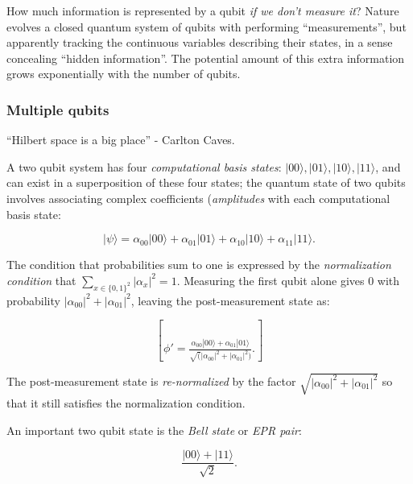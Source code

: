 \documentclass{article}
\numberwithin{equation}{section}
\newcommand{\bracket}[1]{|#1\rangle}
\begin{document}
How much information is represented by a qubit \textit{if we don't measure it}? Nature evolves a closed quantum system of qubits with performing ``measurements'', but apparently tracking the continuous variables describing their states, in a sense concealing ``hidden information''. The potential amount of this extra information grows exponentially with the number of qubits.

\subsubsection{Multiple qubits}

``Hilbert space is a big place'' - Carlton Caves.

A two qubit system has four \textit{computational basis states}: $\bracket{00}, \bracket{01}, \bracket{10}, \bracket{11}$, and can exist in a superposition of these four states; the quantum state of two qubits involves associating complex coefficients (\textit{amplitudes} with each computational basis state:

\begin{equation} \label{eq:1.4}
\bracket{\psi} = \alpha_{00} \bracket{00} + \alpha_{01} \bracket{01} + \alpha_{10} \bracket{10} + \alpha_{11} \bracket{11}.
\end{equation}

The condition that probabilities sum to one is expressed by the \textit{normalization condition} that $\sum_{x \in \{0, 1\}^2} |\alpha_x|^2 = 1$. Measuring the first qubit alone gives 0 with probability $|\alpha_{00}|^2 + |\alpha_{01}|^2$, leaving the post-measurement state as:

\begin{equation} \label{eq:1.5}
\brack{\phi'} = \frac{\alpha_{00} \bracket{00} + \alpha_{01} \bracket{01}}{\sqrt(|\alpha_{00}|^2 + |\alpha_{01}|^2)}.
\end{equation}

The post-measurement state is \textit{re-normalized} by the factor $\sqrt{|\alpha_{00}|^2 + |\alpha_{01}|^2}$ so that it still satisfies the normalization condition.

An important two qubit state is the \textit{Bell state} or \textit{EPR pair}:

\begin{equation} \label{eq:1.7}
\frac{\bracket{00} + \bracket{11}}{\sqrt{2}}.
\end{equation}
\end{document}
